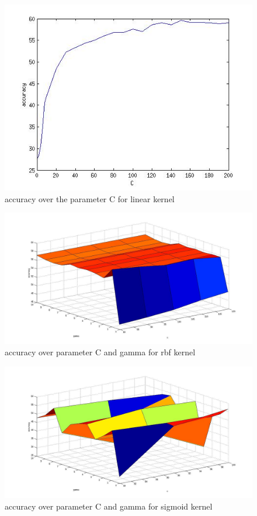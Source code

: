 \documentclass[paper=a4, fontsize=15pt]{article} %
\begin{document}
\begin{figure}[hb]
\includegraphics[width=\linewidth]{./a2_datacode/lr/linear_model_parameter.jpg}
\caption{accuracy over the parameter C for linear kernel}
\label{fig:linear_model}
\end{figure}

\begin{figure}[hb]
\includegraphics[width=\linewidth]{./a2_datacode/lr/rbf_parameter.jpg}
\caption{accuracy over parameter C and gamma for rbf kernel}
\label{fig:rbf_model}
\end{figure}

\begin{figure}[hb]
\includegraphics[width=\linewidth]{./a2_datacode/lr/sigmoid.jpg}
\caption{accuracy over parameter C and gamma for sigmoid kernel}
\label{fig:sigmoid_model}
\end{figure}
\end{document}
